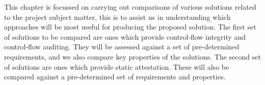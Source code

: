 This chapter is focussed on carrying out comparisons of various solutions related to the project subject matter, this is to assist us in understanding which approaches will be most useful for producing the proposed solution. The first set of solutions to be compared are ones which provide control-flow integrity and control-flow auditing. They will be assessed against a set of pre-determined requirements, and we also compare key properties of the solutions. The second set of solutions are ones which provide static attestation. These will also be compared against a pre-determined set of requirements and properties.
